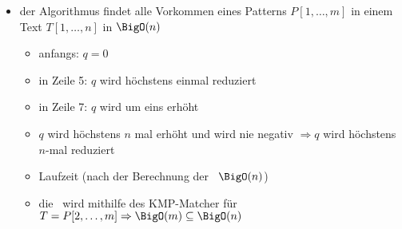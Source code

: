 \begin{itemize}[itemsep=-2pt]
	\item der Algorithmus findet alle Vorkommen eines Patterns $P[1,\dots,m]$ in einem Text $T[1,\dots,n]$ in $\BigO(n)$
		\vspace*{-1.5\baselineskip}\Proof\up
			\begin{itemize}[itemsep=-2pt]
				\item anfangs: $q=0$
				\item in Zeile 5: $q$ wird höchstens einmal reduziert
				\item in Zeile 7: $q$ wird um eins erhöht
				\item $q$ wird höchstens $n$ mal erhöht und wird nie negativ $\Rightarrow q$ wird höchstens $n$-mal reduziert
				\item Laufzeit (nach der Berechnung der \bound~$\BigO(n)$)
				\item die \bound~wird mithilfe des KMP-Matcher für $T=P[2,\dots,m] \Rightarrow \BigO(m)\subseteq\BigO(n)$
			\end{itemize}
\end{itemize}